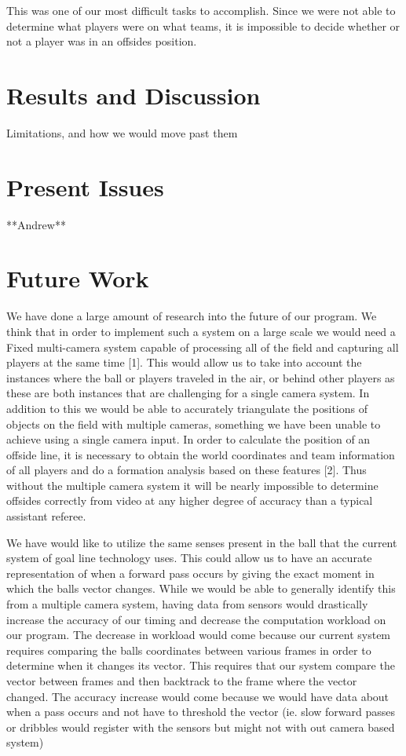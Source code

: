 \documentclass[letterpaper, 10 pt, conference]{ieeeconf}  %
\begin{document}
This was one of our most difficult tasks to accomplish. Since we were not able to determine what players were on what teams, it is impossible to decide whether or not a player was in an offsides position. 


\section{Results and Discussion}

Limitations, and how we would move past them


\section{Present Issues}

**Andrew** 

\section{Future Work}

We have done a large amount of research into the future of our program. We think that in order to implement such a system on a large scale we would need a Fixed multi-camera system capable of processing all of the field and capturing all players at the same time [1]. This would allow us to take into account the instances where the ball or players traveled in the air, or behind other players as these are both instances that are challenging for a single camera system. In addition to this we would be able to accurately triangulate the positions of objects on the field with multiple cameras, something we have been unable to achieve using a single camera input. In order to calculate the position of an offside line, it is necessary to obtain the world coordinates and team information of all players and do a formation analysis based on these features [2]. Thus without the multiple camera system it will be nearly impossible to determine offsides correctly from video at any higher degree of accuracy than a typical assistant referee.

We have would like to utilize the same senses present in the ball that the current system of goal line technology uses. This could allow us to have an accurate representation of when a forward pass occurs by giving the exact moment in which the balls vector changes. While we would be able to generally identify this from a multiple camera system, having data from sensors would drastically increase the accuracy of our timing and decrease the computation workload on our program. The decrease in workload would come because our current system requires comparing the balls coordinates between various frames in order to determine when it changes its vector. This requires that our system compare the vector between frames and then backtrack to the frame where the vector changed. The accuracy increase would come because we would have data about when a pass occurs and not have to threshold the vector (ie. slow forward passes or dribbles would register with the sensors but might not with out camera based system) 
\end{document}

